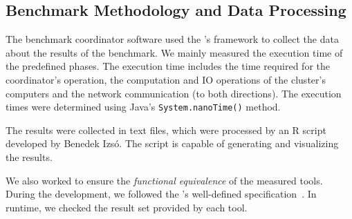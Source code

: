 \subsection{Benchmark Methodology and Data Processing}
\label{benchmark-methodology}

The benchmark coordinator software used the \tb{}'s framework to collect the data about the results of the benchmark. We mainly measured the execution time of the predefined phases. The execution time includes the time required for the coordinator's operation, the computation and IO operations of the cluster's computers and the network communication (to both directions). The execution times were determined using Java's \texttt{System.nanoTime()} method.

The results were collected in text files, which were processed by an R script \cite{RProject} developed by Benedek Izsó. The script is capable of generating and visualizing the results. 

We also worked to ensure the \emph{functional equivalence} of the measured tools. During the development, we followed the \tb{}'s well-defined specification~\cite{ASE2013}. In runtime, we checked the result set provided by each tool.
